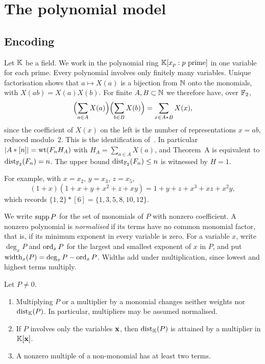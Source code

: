 \section{The polynomial model}\label{sec:prelim}

\subsection{Encoding}
Let $\mathbb{K}$ be a field. We work in the polynomial ring $\mathbb{K}[x_p : p\text{ prime}]$ in one variable for each prime. Every polynomial involves only finitely many variables. Unique factorisation shows that $a\mapsto X(a)$ is a bijection from $\mathbb{N}$ onto the monomials, with $X(ab)=X(a)X(b)$. For finite $A,B\subset\mathbb{N}$ we therefore have, over $\mathbb{F}_2$,
\begin{equation}\label{eq:encoding}
 \Bigl(\sum_{a\in A}X(a)\Bigr)\Bigl(\sum_{b\in B}X(b)\Bigr)=\sum_{x\in A*B}X(x),
\end{equation}
since the coefficient of $X(x)$ on the left is the number of representations $x=ab$, reduced modulo~$2$. This is the identification of~\cite[Lemmas~2.1 and~2.2]{HP}. In particular $|A*[n]|=\operatorname{wt}(F_nH_A)$ with $H_A=\sum_{a\in A}X(a)$, and Theorem~A is equivalent to $\operatorname{dist}_{\mathbb{F}_2}(F_n)=n$. The upper bound $\operatorname{dist}_{\mathbb{F}_2}(F_n)\le n$ is witnessed by $H=1$.

For example, with $x=x_2$, $y=x_3$, $z=x_5$,
\[
 (1+x)(1+x+y+x^2+z+xy)=1+y+z+x^3+xz+x^2y,
\]
which records $\{1,2\}*[6]=\{1,3,5,8,10,12\}$.

We write $\operatorname{supp} P$ for the set of monomials of $P$ with nonzero coefficient. A nonzero polynomial is \emph{normalised} if its terms have no common monomial factor, that is, if its minimum exponent in every variable is zero. For a variable $x$, write $\deg_x P$ and $\operatorname{ord}_x P$ for the largest and smallest exponent of $x$ in $P$, and put $\operatorname{width}_x(P)=\deg_xP-\operatorname{ord}_xP$. Widths add under multiplication, since lowest and highest terms multiply.

\begin{lemma}\label{lem:reductions}
Let $P\ne0$.
\begin{enumerate}[label=\textup{(\alph*)}]
\item Multiplying $P$ or a multiplier by a monomial changes neither weights nor $\operatorname{dist}_{\mathbb{K}}(P)$. In particular, multipliers may be assumed normalised.
\item If $P$ involves only the variables $\mathbf{x}$, then $\operatorname{dist}_{\mathbb{K}}(P)$ is attained by a multiplier in $\mathbb{K}[\mathbf{x}]$.
\item A nonzero multiple of a non-monomial has at least two terms.
\end{enumerate}
\end{lemma}


